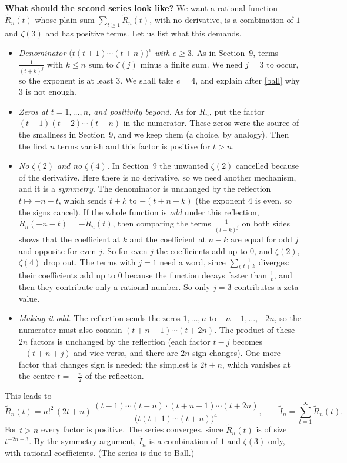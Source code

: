 \documentclass[11pt]{article}
\theoremstyle{remark}
\newcommand{\q}[1]{\medskip\noindent\textbf{#1}}
\begin{document}
\q{What should the second series look like?} We want a rational function $\widetilde R_n(t)$
whose plain sum $\sum_{t\ge1}\widetilde R_n(t)$, with no derivative, is a combination of $1$ and
$\zeta(3)$ and has positive terms. Let us list what this demands.
\begin{itemize}
\item \emph{Denominator $\bigl(t(t+1)\cdots(t+n)\bigr)^e$ with $e\ge3$.} As in Section~9, terms
$\frac1{(t+k)^j}$ with $k\le n$ sum to $\zeta(j)$ minus a finite sum. We need $j=3$ to occur, so the
exponent is at least $3$. We shall take $e=4$, and explain after \eqref{ball} why $3$ is not enough.
\item \emph{Zeros at $t=1,\dots,n$, and positivity beyond.} As for $R_n$, put the factor
$(t-1)(t-2)\cdots(t-n)$ in the numerator. These zeros were the source of the smallness in
Section~9, and we keep them (a choice, by analogy). Then the first $n$ terms vanish and this factor
is positive for $t>n$.
\item \emph{No $\zeta(2)$ and no $\zeta(4)$.} In Section~9 the unwanted $\zeta(2)$ cancelled because
of the derivative. Here there is no derivative, so we need another mechanism, and it is a
\emph{symmetry}. The denominator is unchanged by the reflection $t\mapsto-n-t$, which sends $t+k$ to
$-(t+n-k)$ (the exponent $4$ is even, so the signs cancel). If the whole function is \emph{odd} under this reflection,
$\widetilde R_n(-n-t)=-\widetilde R_n(t)$, then comparing the terms $\frac1{(t+k)^j}$ on both sides
shows that the coefficient at $k$ and the coefficient at $n-k$ are equal for odd $j$ and opposite
for even $j$. So for even $j$ the coefficients add up to $0$, and $\zeta(2)$, $\zeta(4)$ drop out. The terms
with $j=1$ need a word, since $\sum_t\frac1{t+k}$ diverges: their coefficients add up to $0$ because
the function decays faster than $\frac1t$, and then they contribute only a rational number. So only
$j=3$ contributes a zeta value.
\item \emph{Making it odd.} The reflection sends the zeros $1,\dots,n$ to $-n-1,\dots,-2n$, so the
numerator must also contain $(t+n+1)\cdots(t+2n)$. The product of these $2n$ factors is unchanged
by the reflection (each factor $t-j$ becomes $-(t+n+j)$ and vice versa, and there are $2n$ sign
changes). One more factor that changes sign is needed; the simplest is $2t+n$, which vanishes at the
centre $t=-\frac n2$ of the reflection.
\end{itemize}
This leads to
\begin{equation}\label{ball}
\widetilde R_n(t)=n!^2\,(2t+n)\,\frac{(t-1)\cdots(t-n)\cdot(t+n+1)\cdots(t+2n)}
{\bigl(t(t+1)\cdots(t+n)\bigr)^4},\qquad\widetilde I_n=\sum_{t=1}^\infty\widetilde R_n(t).
\end{equation}
For $t>n$ every factor is positive. The series converges, since $\widetilde R_n(t)$ is of size
$t^{-2n-3}$. By the symmetry argument, $\widetilde I_n$ is a combination of $1$ and $\zeta(3)$ only, with
rational coefficients. (The series is due to Ball.)
\end{document}
